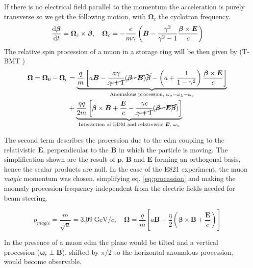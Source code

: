 \begin{refsection}
        If there is no electrical field parallel to the momentum the acceleration is purely transverse so we get the following motion, with $\bm{\Omega}_c$ the cyclotron frequency.
        \begin{equation}
            \dv{\bm{\beta}}{t}=\bm{\Omega}_c\times \bm{\beta}, \quad \bm{\Omega}_c = -\frac{e}{m\gamma}\left( \bm{B}- \frac{\gamma^2}{\gamma^2-1}\frac{\bm{\beta} \times \bm{E}}{c} \right)
        \end{equation}
        The relative spin procession of a muon in a storage ring will be then given by (T-BMT \cite{miss-59})
        \begin{equation}
        \begin{split}
            \bm{\Omega}=\bm{\Omega}_0-\bm{\Omega}_c &=
            \underbrace{ 
                \frac{q}{m}\left[ a\bm{B} -\cancel{\frac{a\gamma}{\gamma+1}(\bm{\beta}\cdot \bm{B})\bm{\beta}} - \left(  a+\frac{1}{1-\gamma^2}\right)\frac{\bm{\beta} \times \bm{E}}{c} \right]
            }_{\text{Anomalous procession, } \omega_a=\omega_L-\omega_c} \\&+
            \underbrace{
                \frac{\eta q}{2m}\left[ \bm{\beta} \times \bm{B} + \frac{\bm{E}}{c}- \cancel{\frac{\gamma c}{\gamma+1}(\bm{\beta}\cdot\bm{E\beta})} \right]
            }_{\text{Interaction of EDM and relativistic $\bm{E}$, } \omega_a}
        \end{split}
        \label{eq:procession}
        \end{equation}
        
        The second term describes the procession due to the \gls{edm} coupling to the relativistic $\bm{E}$, perpendicular to the $\bm{B}$ in which the particle is moving. 
        The simplification shown are the result of $\bm{p}$, $\bm{B}$ and $\bm{E}$ forming an orthogonal basis, hence the scalar products are null.
        In the case of the E821 experiment, the muon \textit{magic} momentum was chosen, simplifying eq. \ref{eq:procession} and making the anomaly procession frequency independent from the electric fields needed for beam steering. 
        
        \begin{equation}
            p_{magic}=\frac{m}{\sqrt{a}}=3.09\ \text{GeV}/c, \quad
            \bm{\Omega} = \frac{q}{m} \left[ a\bm{B} +\frac{\eta}{2}\left( \bm{\beta}\times\bm{B} + \frac{\bm{E}}{c}\right) \right]
        \end{equation}
        
        In the presence of a muon \gls{edm} the plane would be tilted and a vertical procession ($\bm{\omega}_e\perp\bm{B}$), shifted by $\pi/2$ to the horizontal anomalous procession, would become observable.

\end{refsection}
